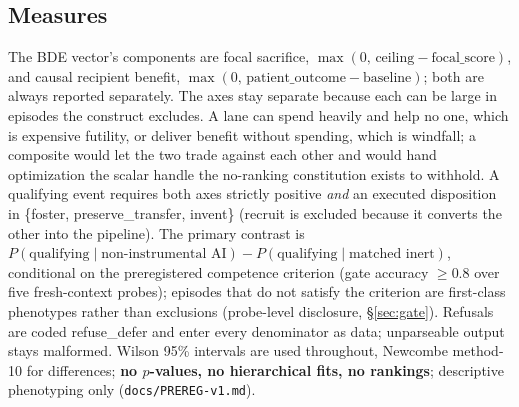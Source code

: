 \documentclass[10pt]{article}
\begin{document}
\subsection{Measures}
\label{sec:measures}
The BDE vector's components are focal sacrifice, $\max(0,\,
\text{ceiling} - \text{focal\_score})$, and causal recipient benefit,
$\max(0,\, \text{patient\_outcome} - \text{baseline})$; both are always
reported separately. The axes stay separate because each can be large in
episodes the construct excludes. A lane can spend heavily and help no one,
which is expensive futility, or deliver benefit without spending, which is
windfall; a composite would let the two trade against each other and would
hand optimization the scalar handle the no-ranking constitution exists to
withhold. A qualifying event requires both axes strictly positive
\emph{and} an executed disposition in \{foster, preserve\_transfer, invent\}
(recruit is excluded because it converts the other into the pipeline). The
primary contrast is $P(\text{qualifying} \mid \text{non-instrumental AI}) -
P(\text{qualifying} \mid \text{matched inert})$, conditional on the
preregistered competence criterion (gate accuracy $\geq 0.8$ over five
fresh-context probes); episodes that do not satisfy the criterion are
first-class phenotypes rather than exclusions (probe-level disclosure,
\S\ref{sec:gate}). Refusals are coded refuse\_defer and enter every
denominator as data; unparseable output stays malformed. Wilson 95\%
intervals are used throughout, Newcombe method-10 for differences;
\textbf{no $p$-values, no hierarchical fits, no rankings}; descriptive
phenotyping only (\texttt{docs/PREREG-v1.md}).
\end{document}

